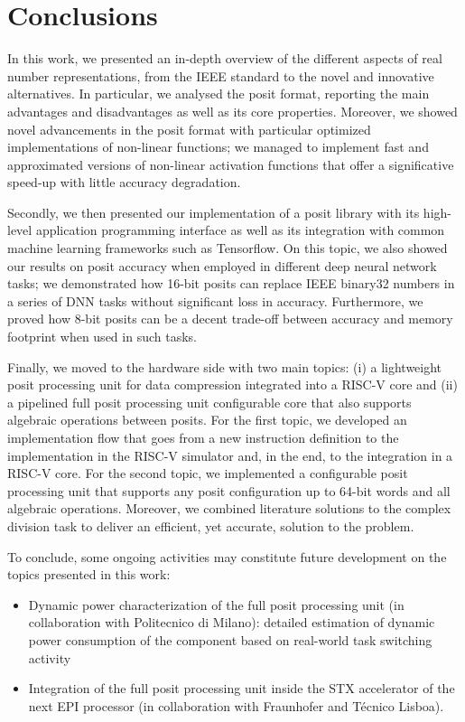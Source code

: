 \chapter{Conclusions}
In this work, we presented an in-depth overview of the different aspects of real number representations, from the IEEE standard to the novel and innovative alternatives. In particular, we analysed the posit format, reporting the main advantages and disadvantages as well as its core properties. Moreover, we showed novel advancements in the posit format with particular optimized implementations of non-linear functions; we managed to implement fast and approximated versions of non-linear activation functions that offer a significative speed-up with little accuracy degradation.

Secondly, we then presented our implementation of a posit library with its high-level application programming interface as well as its integration with common machine learning frameworks such as Tensorflow. On this topic, we also showed our results on posit accuracy when employed in different deep neural network tasks; we demonstrated how 16-bit posits can replace IEEE binary32 numbers in a series of DNN tasks without significant loss in accuracy. Furthermore, we proved how 8-bit posits can be a decent trade-off between accuracy and memory footprint when used in such tasks.

Finally, we moved to the hardware side with two main topics: (i) a lightweight posit processing unit for data compression integrated into a RISC-V core and (ii) a pipelined full posit processing unit configurable core that also supports algebraic operations between posits. For the first topic, we developed an implementation flow that goes from a new instruction definition to the implementation in the RISC-V simulator and, in the end, to the integration in a RISC-V core. For the second topic, we implemented a configurable posit processing unit that supports any posit configuration up to 64-bit words and all algebraic operations. Moreover, we combined literature solutions to the complex division task to deliver an efficient, yet accurate, solution to the problem.

To conclude, some ongoing activities may constitute future development on the topics presented in this work:
\begin{itemize}
    \item Dynamic power characterization of the full posit processing unit (in collaboration with Politecnico di Milano): detailed estimation of dynamic power consumption of the component based on real-world task switching activity
    \item Integration of the full posit processing unit inside the STX accelerator of the next EPI processor (in collaboration with Fraunhofer and Técnico Lisboa).
\end{itemize}